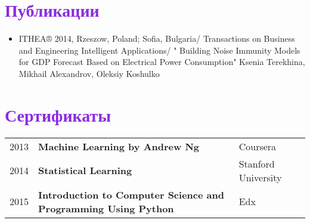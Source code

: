 \documentclass[a4paper, oneside, final]{scrartcl} %
\begin{document}
\begin{center}
\begin{minipage}{.99\linewidth}
\section{\textbf{\textcolor{BlueViolet}{Публикации}}}
\begin{itemize}
\item  ITHEA® 2014, Rzeszow, Poland; Sofia, Bulgaria/ Transactions on Business and Engineering Intelligent Applications/ " Building Noise Immunity Models for GDP Forecast Based on Electrical Power Consumption" Ksenia Terekhina, Mikhail Alexandrov, Oleksiy Koshulko
\end{itemize}

\end{minipage}

\section{\textbf{\textcolor{BlueViolet}{Сертификаты}}}

\begin{tabular}{cp{11cm}p{1cm}}
2013 & \textbf{Machine Learning by Andrew Ng} & Coursera  \\
2014 & \textbf{Statistical Learning} & Stanford University  \\
2015 & \textbf{Introduction to Computer Science and Programming Using Python} & Edx  \\

\end{tabular}


\end{center}
\end{document}
